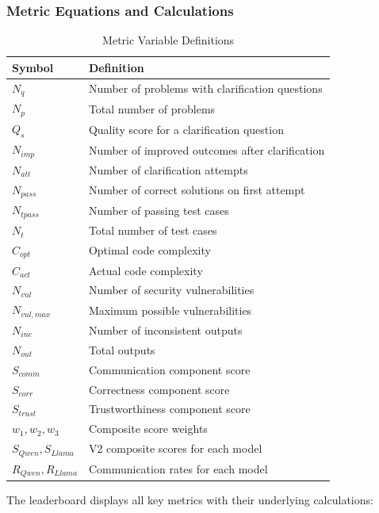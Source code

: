 \documentclass[conference]{IEEEtran}
\begin{document}
\subsubsection{Metric Equations and Calculations}

\begin{table}[ht]
\centering
\caption{Metric Variable Definitions}
\begin{tabular}{ll}
\toprule
\textbf{Symbol} & \textbf{Definition} \\
\midrule
$N_{q}$ & Number of problems with clarification questions \\
$N_{p}$ & Total number of problems \\
$Q_{s}$ & Quality score for a clarification question \\
$N_{imp}$ & Number of improved outcomes after clarification \\
$N_{att}$ & Number of clarification attempts \\
$N_{pass}$ & Number of correct solutions on first attempt \\
$N_{tpass}$ & Number of passing test cases \\
$N_{t}$ & Total number of test cases \\
$C_{opt}$ & Optimal code complexity \\
$C_{act}$ & Actual code complexity \\
$N_{vul}$ & Number of security vulnerabilities \\
$N_{vul,max}$ & Maximum possible vulnerabilities \\
$N_{inc}$ & Number of inconsistent outputs \\
$N_{out}$ & Total outputs \\
$S_{comm}$ & Communication component score \\
$S_{corr}$ & Correctness component score \\
$S_{trust}$ & Trustworthiness component score \\
$w_1, w_2, w_3$ & Composite score weights \\
$S_{Qwen}, S_{Llama}$ & V2 composite scores for each model \\
$R_{Qwen}, R_{Llama}$ & Communication rates for each model \\
\bottomrule
\end{tabular}
\label{tab:variables}
\end{table}

The leaderboard displays all key metrics with their underlying calculations:
\end{document}
